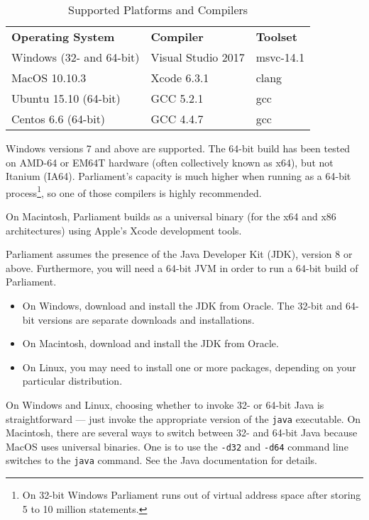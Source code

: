 \begin{table}[htbp]
	\centering
	\begin{tabular}{lll}
		\toprule
		\textbf{Operating System} & \textbf{Compiler} & \textbf{Toolset} \\
		\headingrule
		Windows (32- and 64-bit) & Visual Studio 2017 & msvc-14.1 \\
		\midrule
		MacOS 10.10.3 & Xcode 6.3.1 & clang \\
		\midrule
		Ubuntu 15.10 (64-bit) & GCC 5.2.1 & gcc \\
		\midrule
		Centos 6.6 (64-bit) & GCC 4.4.7 & gcc \\
		\bottomrule
	\end{tabular}
	\caption{Supported Platforms and Compilers}
	\label{platforms-and-compilers}
\end{table}

Windows versions 7 and above are supported.  The 64-bit build has been tested on AMD-64 or EM64T hardware (often collectively known as x64), but not Itanium (IA64).  Parliament's capacity is much higher when running as a 64-bit process\footnote{On 32-bit Windows Parliament runs out of virtual address space after storing 5 to 10 million statements.}, so one of those compilers is highly recommended.

On Macintosh, Parliament builds as a universal binary (for the x64 and x86 architectures) using Apple's Xcode development tools.

Parliament assumes the presence of the Java Developer Kit (JDK), version 8 or above.  Furthermore, you will need a 64-bit JVM in order to run a 64-bit build of Parliament.
\begin{itemize}
	\item On Windows, download and install the JDK from Oracle.  The 32-bit and 64-bit versions are separate downloads and installations.

	\item On Macintosh, download and install the JDK from Oracle.

	\item On Linux, you may need to install one or more packages, depending on your particular distribution.
\end{itemize}

On Windows and Linux, choosing whether to invoke 32- or 64-bit Java is straightforward --- just invoke the appropriate version of the \verb|java| executable.  On Macintosh, there are several ways to switch between 32- and 64-bit Java because MacOS uses universal binaries.  One is to use the \verb|-d32| and \verb|-d64| command line switches to the \verb|java| command.  See the Java documentation for details.

